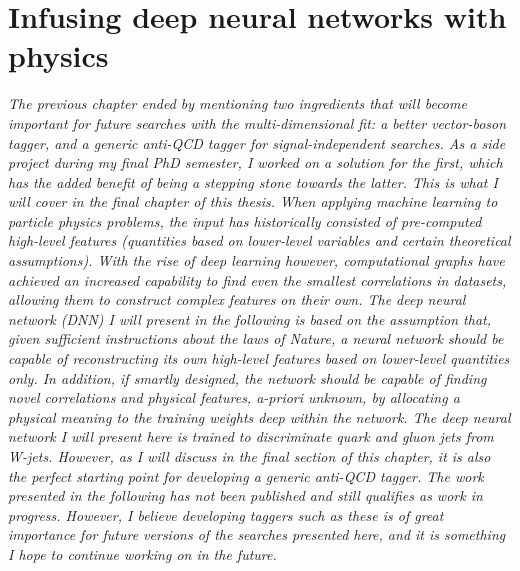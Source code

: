 \vspace*{\fill}

\section*{Infusing deep neural networks with physics}
\label{sec:lolaintro}
\begin{centering}
\textit{
The previous chapter ended by mentioning two ingredients that will become important for future searches with the multi-dimensional fit: a better vector-boson tagger, and a generic anti-QCD tagger for signal-independent searches. As a side project during my final PhD semester, I worked on a solution for the first, which has the added benefit of being a stepping stone towards the latter. This is what I will cover in the final chapter of this thesis.
\newline
\newline
When applying machine learning to particle physics problems, the input has historically consisted of pre-computed high-level features (quantities based on lower-level variables and certain theoretical assumptions).
With the rise of deep learning however, computational graphs have achieved an increased capability to find even the smallest correlations in datasets, allowing them to construct complex features on their own. The deep neural network (DNN) I will present in the following is based on the assumption that, given sufficient instructions about the laws of Nature, a neural network should be capable of reconstructing its own high-level features based on lower-level quantities only. In addition, if smartly designed, the network should be capable of finding novel correlations and physical features, a-priori unknown, by allocating a physical meaning to the training weights deep within the network. The deep neural network I will present here is trained to discriminate quark and gluon jets from W-jets. However, as I will discuss in the final section of this chapter, it is also the perfect starting point for developing a generic anti-QCD tagger.
\newline
\newline
The work presented in the following has not been published and still qualifies as work in progress. However, I believe developing taggers such as these is of great importance for future versions of the searches presented here, and it is something I hope to continue working on in the future.
}
\end{centering}
